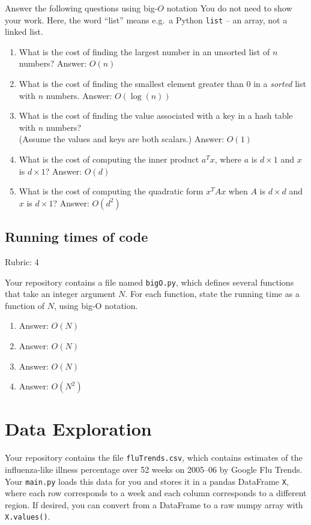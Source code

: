 \documentclass{article}
\newcommand{\ans}[1]{\green{Answer: #1}}
\newcommand{\rubric}[1]{\green{Rubric: #1}}
\newcommand{\blue}[1]{{\color{blue}#1}}
\newcommand{\green}[1]{{\color{green}#1}}
\begin{document}
    \blue{Answer the following questions using big-$O$ notation} You do not need to show your work.
    Here, the word ``list'' means e.g.\ a Python \texttt{list} -- an array, not a linked list.
    \begin{enumerate}
        \item What is the cost of finding the largest number in an unsorted list of $n$ numbers? \ans{$O(n)$}
        \item What is the cost of finding the smallest element greater than 0 in a \emph{sorted} list with $n$ numbers. \ans{$O(\log(n))$}
        \item What is the cost of finding the value associated with a key in a hash table with $n$ numbers? \\(Assume the values and keys are both scalars.) \ans{$O(1)$}
        \item What is the cost of computing the inner product $a^T x$, where $a$ is $d \times 1$ and $x$ is $d \times 1$? \ans{$O(d)$}
        \item What is the cost of computing the quadratic form $x^T Ax$ when $A$ is $d \times d$ and $x$ is $d \times 1$? \ans{$O(d^2)$}
    \end{enumerate}

    \subsection{Running times of code}
    \rubric{4}

    Your repository contains a file named \texttt{bigO.py}, which defines several functions
    that take an integer argument $N$. For each function, \blue{state the running time as a function of $N$, using big-O notation}.

    \begin{enumerate}
        \item \ans{$O(N)$}
        \item \ans{$O(N)$}
        \item \ans{$O(N)$}
        \item \ans{$O(N^2)$}
    \end{enumerate}

    \section{Data Exploration}


    Your repository contains the file \texttt{fluTrends.csv}, which contains estimates
    of the influenza-like illness percentage over 52 weeks on 2005--06 by Google Flu Trends.
    Your \texttt{main.py} loads this data for you and stores it in a pandas DataFrame \texttt{X},
    where each row corresponds to a week and each column
    corresponds to a different
    region. If desired, you can convert from a DataFrame to a raw numpy array with \texttt{X.values()}.
\end{document}
